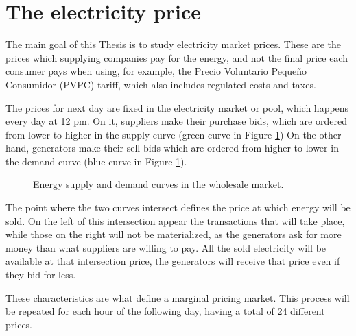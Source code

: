 \section{The electricity price}
The main goal of this Thesis is to study electricity market prices.
These are the prices which supplying companies pay for the energy, and not the final price each consumer pays when using, for example, the Precio Voluntario Pequeño Consumidor (PVPC) tariff, which also includes regulated costs and taxes. \cite{mercado-electrico-xataka}

The prices for next day are fixed in the electricity market or pool, which happens every day at 12 pm.
On it, suppliers make their purchase bids, which are ordered from lower to higher in the supply curve (green curve in Figure \ref{fig:supply-demand-curves})
On the other hand, generators make their sell bids which are ordered from higher to lower in the demand curve (blue curve in Figure \ref{fig:supply-demand-curves}).

\begin{figure}[H]
\centering
    \caption{Energy supply and demand curves in the wholesale market. \cite{curva-oferta-demanda}}
    \label{fig:supply-demand-curves}
\end{figure}

The point where the two curves intersect defines the price at which energy will be sold. On the left of this intersection appear the transactions that will take place, while those on the right will not be materialized, as the generators ask for more money than what suppliers are willing to pay.
All the sold electricity will be available at that intersection price, the generators will receive that price even if they bid for less.

These characteristics are what define a marginal pricing market.
This process will be repeated for each hour of the following day, having a total of 24 different prices.

